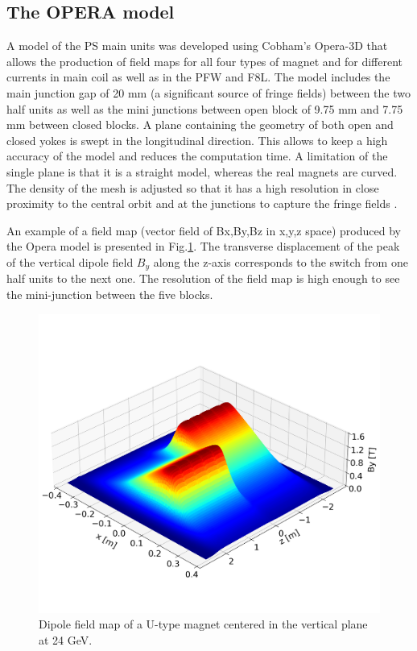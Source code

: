 \documentclass[a4paper,
               biblatex,     %
               keeplastbox,   %
               ]{jacow}
\begin{document}
\subsection{The OPERA model}
A model of the PS main units was developed using Cobham's Opera-3D that allows the production of field maps for all four types of magnet and for different currents in main coil as well as in the PFW and F8L. The model includes the main junction gap of 20 mm (a significant source of fringe fields) between the two half units as well as the mini junctions between open block of 9.75 mm and 7.75 mm between closed blocks. A plane containing the geometry of both open and closed yokes is swept in the longitudinal direction. This allows to keep a high accuracy of the model and reduces the computation time. A limitation of the single plane is that it is a straight model, whereas the real magnets are curved. The density of the mesh is adjusted so that it has a high resolution in close proximity to the central orbit and at the junctions to capture the fringe fields \cite{anglada_reference_2019}.

An example of a field map (vector field of Bx,By,Bz in x,y,z space) produced by the Opera model is presented in Fig.\ref{fig:dipole_field}. The transverse displacement of the peak of the vertical dipole field $B_{y}$ along the z-axis corresponds to the switch from one half units to the next one. The resolution of the field map is high enough to see the mini-junction between the five blocks.

\begin{figure}[!htb]
   \centering
   \includegraphics*[width=1.0\columnwidth, trim={0 2.9cm 0 4.3cm},clip]{MOPOTK030_f3.png}
   \caption{Dipole field map of a U-type magnet centered in the vertical plane at 24 GeV.}
   \label{fig:dipole_field}
\end{figure}
\end{document}
